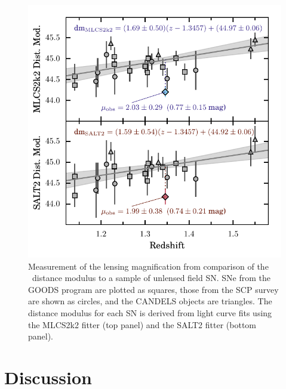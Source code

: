 \begin{figure}
\begin{center}
\includegraphics[width=\columnwidth]{FIG/snTomas_hubble_diagram}
\caption{ Measurement of the lensing magnification from comparison of
the \tomas\ distance modulus to a sample of unlensed field SN.  SNe
from the GOODS program are plotted as squares, those from the SCP
survey are shown as circles, and the CANDELS objects are triangles.
The distance modulus for each SN is derived from light curve fits
using the MLCS2k2 fitter (top panel) and the SALT2 fitter (bottom
panel).  
\label{fig:MagnificationMeasurement} }
\end{center}
\end{figure}


\section{Discussion}
\label{sec:Discussion}


